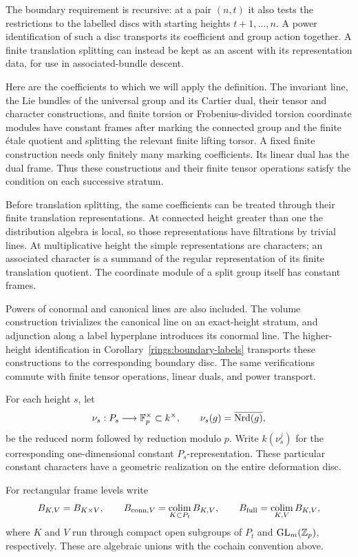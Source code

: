 The boundary requirement is recursive: at a pair $(n,t)$ it also
tests the restrictions to the labelled discs with starting heights
$t+1,\ldots,n$.  A power identification of such a disc transports
its coefficient and group action together.  A finite translation
splitting can instead be kept as an ascent with its representation
data, for use in associated-bundle descent.

Here are the coefficients to which we will apply the definition.
The invariant line, the Lie bundles of the universal group and its
Cartier dual, their tensor and character constructions, and finite
torsion or Frobenius-divided torsion
coordinate modules have constant frames after marking the connected
group and the finite \'{e}tale quotient and splitting the relevant
finite lifting torsor.  A fixed finite construction needs only
finitely many marking coefficients.  Its linear dual has the dual
frame.  Thus these constructions and their finite tensor operations
satisfy the condition on each successive stratum.

Before translation splitting, the same coefficients can be treated
through their finite translation representations.  At connected
height greater than one the distribution algebra is local, so those
representations have filtrations by trivial lines.  At multiplicative
height the simple representations are characters; an associated
character is a summand of the regular representation of its finite
translation quotient.  The coordinate module of a split group itself
has constant frames.

Powers of conormal and canonical lines are also included.  The volume
construction trivializes the canonical line on an exact-height
stratum, and adjunction along a label hyperplane introduces its
conormal line.  The higher-height identification in
Corollary~\ref{rings:boundary-labels} transports these constructions
to the corresponding boundary disc.  The same verifications commute
with finite tensor operations, linear duals, and power transport.

For each height $s$, let
\[
 \nu_s:P_s\longrightarrow\mathbb F_p^\times\subset k^\times,
 \qquad
 \nu_s(g)=\overline{\operatorname{Nrd}(g)},
\]
be the reduced norm followed by reduction modulo $p$.  Write
$k(\nu_s^j)$ for the corresponding one-dimensional constant
$P_s$-representation.  These particular constant characters have a
geometric realization on the entire deformation disc.

For rectangular frame levels write
\[
 B_{K,V}=B_{K\times V},\qquad
 B_{\mathrm{conn},V}=\operatorname*{colim}_{K\subset P_t}B_{K,V},\qquad
 B_{\mathrm{full}}=\operatorname*{colim}_{K,V}B_{K,V},
\]
where $K$ and $V$ run through compact open subgroups of $P_t$ and
$\operatorname{GL}_m(\mathbb Z_p)$, respectively.  These are algebraic unions with the cochain
convention above.

